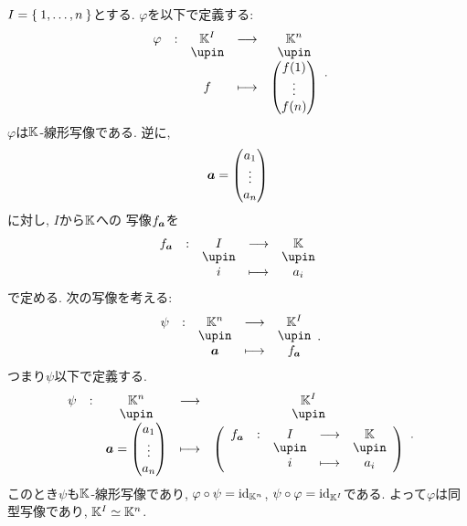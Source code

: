 \begin{example}
  $I=\Set{1,\dots,n}$とする.
  $\varphi$を以下で定義する:
  \begin{align*}
    \shazo{\varphi}{\KK^I}{\KK^n}{f}{\begin{pmatrix}f(1)\\\vdots\\f(n)\end{pmatrix}}.
  \end{align*}
  $\varphi$は$\mathbb{K}$-線形写像である.
  逆に,
  \begin{align*}
    \boldsymbol{a}=
    \begin{pmatrix}
      a_1\\\vdots\\a_n
    \end{pmatrix}
  \end{align*}
  に対し,
  $I$から$\mathbb{K}$への
  写像$f_{\boldsymbol{a}}$を
  \begin{align*}
    \shazo{f_{\aaa}}{I}{\KK}{i}{a_i}
  \end{align*}
  で定める.
  次の写像を考える:
  \begin{align*}
    \shazo{\psi}{\KK^n}{\KK^I}{\aaa}{f_{\aaa}}.
  \end{align*}
  つまり$\psi$以下で定義する.
  \begin{align*}
    \shazo{\psi}{\KK^n}{\KK^I}{\aaa=
    \begin{pmatrix}
      a_1\\\vdots\\a_n
    \end{pmatrix}
  }{\left(\shazo{f_{\aaa}}{I}{\KK}{i}{a_i}\right)}.
  \end{align*}
  このとき$\psi$も$\mathbb{K}$-線形写像であり,
  $\varphi\circ\psi=\operatorname{id}_{\mathbb{K}^n}$,
  $\psi\circ\varphi=\operatorname{id}_{\mathbb{K}^I}$である.
  よって$\varphi$は同型写像であり,
  $\mathbb{K}^I\simeq \mathbb{K}^n$.
\end{example}

